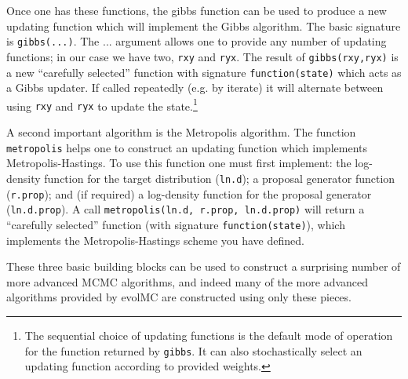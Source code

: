 \documentclass[12pt]{article}\usepackage[]{graphicx}\usepackage[]{color}
\begin{document}
Once one has these functions, the gibbs function can be used to produce a new updating function which will implement the Gibbs algorithm. The basic signature is {\tt gibbs(...)}. The ...  argument allows one to provide any number of updating functions; in our case we have two, {\tt rxy} and {\tt ryx}. The result of {\tt gibbs(rxy,ryx)} is a new ``carefully selected'' function with signature \texttt{function(state)} which acts as a Gibbs updater. If called repeatedly (e.g. by iterate) it will alternate between using {\tt rxy} and {\tt ryx} to update the state.\footnote{The sequential choice of updating functions is the default mode of operation for the function returned by {\tt gibbs}. It can also stochastically select an updating function according to provided weights.}

A second important algorithm is the Metropolis algorithm. The function {\tt metropolis} helps one to construct an updating function which implements Metropolis-Hastings. To use this function one must first implement: the log-density function for the target distribution ({\tt ln.d}); a proposal generator function ({\tt r.prop}); and (if required) a log-density function for the proposal generator ({\tt ln.d.prop}). A call {\tt metropolis(ln.d, r.prop, ln.d.prop)} will return a ``carefully selected'' function (with signature {\tt function(state)}), which implements the Metropolis-Hastings scheme you have defined.

These three basic building blocks can be used to construct a surprising number of more advanced MCMC algorithms, and indeed many of the more advanced algorithms provided by evolMC are constructed using only these pieces.
\end{document}
